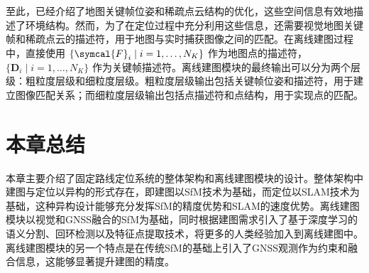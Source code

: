 至此，已经介绍了地图关键帧位姿和稀疏点云结构的优化，这些空间信息有效地描述了环境结构。然而，为了在定位过程中充分利用这些信息，还需要视觉地图关键帧和稀疏点云的描述符，用于地图与实时捕获图像之间的匹配。在离线建图过程中，直接使用 $\{\symcal{F}_i \mid i = 1, \ldots, N_K\}$ 作为地图点的描述符，$\{\symbf{D}_i \mid i = 1, \ldots, N_K\}$ 作为关键帧描述符。离线建图模块的最终输出可以分为两个层级：粗粒度层级和细粒度层级。粗粒度层级输出包括关键帧位姿和描述符，用于建立图像匹配关系；而细粒度层级输出包括点描述符和点结构，用于实现点的匹配。

\section{本章总结}
本章主要介绍了固定路线定位系统的整体架构和离线建图模块的设计。整体架构中建图与定位以异构的形式存在，即建图以SfM技术为基础，而定位以SLAM技术为基础，这种异构设计能够充分发挥SfM的精度优势和SLAM的速度优势。离线建图模块以视觉和GNSS融合的SfM为基础，同时根据建图需求引入了基于深度学习的语义分割、回环检测以及特征点提取技术，将更多的人类经验加入到离线建图中。离线建图模块的另一个特点是在传统SfM的基础上引入了GNSS观测作为约束和融合信息，这能够显著提升建图的精度。
